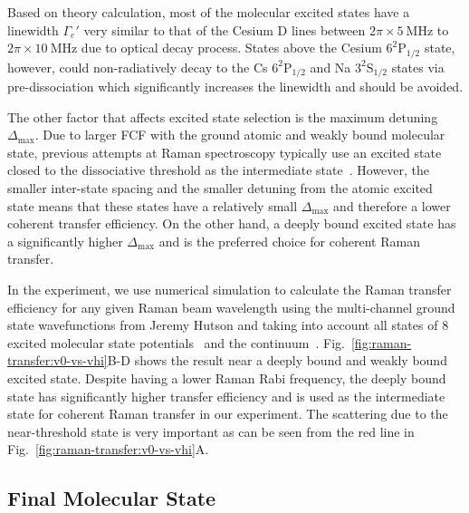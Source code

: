 Based on theory calculation, most of the molecular excited states have a linewidth $\Gamma_e'$
very similar to that of the Cesium D lines between $2\pi\times5~\mathrm{MHz}$ to
$2\pi\times10~\mathrm{MHz}$ due to optical decay process.
States above the Cesium $\mathrm{6^2P_{1/2}}$ state,
however, could non-radiatively decay to the Cs $\mathrm{6^2P_{1/2}}$
and Na $\mathrm{3^2S_{1/2}}$ states
via pre-dissociation which significantly increases the linewidth and should be avoided.

The other factor that affects excited state selection is the maximum detuning $\Delta_{\max}$.
Due to larger FCF with the ground atomic and weakly bound molecular state,
previous attempts at Raman spectroscopy typically use an excited state
closed to the dissociative threshold as
the intermediate state~\cite{wynar_molecules_2000,rom_state_2004}.
However, the smaller inter-state spacing and the smaller detuning from
the atomic excited state means that these states have a relatively small $\Delta_{\max}$
and therefore a lower coherent transfer efficiency.
On the other hand, a deeply bound excited state has a significantly higher $\Delta_{\max}$
and is the preferred choice for coherent Raman transfer.

In the experiment, we use numerical simulation to calculate the Raman transfer efficiency
for any given Raman beam wavelength using the multi-channel ground state wavefunctions from
Jeremy Hutson and taking into account all states of
$8$ excited molecular state potentials~\cite{korek_theoretical_2007,grochola_spin-forbidden_2011,
  zaharova_solution_2009,grochola_investigation_2010,zabawa_production_2012}
and the continuum~\cite{liu_ultracold_2017}.
Fig.~\ref{fig:raman-transfer:v0-vs-vhi}B-D shows the result near a deeply bound
and weakly bound excited state.
Despite having a lower Raman Rabi frequency,
the deeply bound state has significantly higher transfer efficiency
and is used as the intermediate state for coherent Raman transfer in our experiment.
The scattering due to the near-threshold state is very important as can be seen
from the red line in Fig.~\ref{fig:raman-transfer:v0-vs-vhi}A.

\subsection{Final Molecular State}
\label{ch:raman-transfer:state-selection:final}

